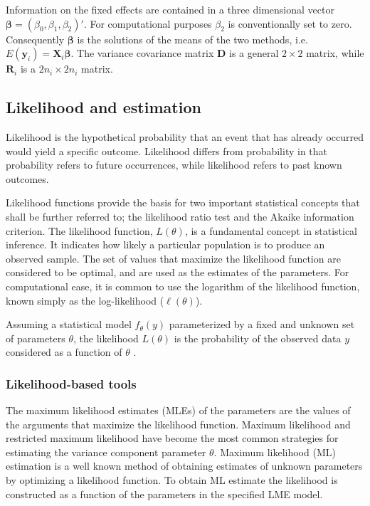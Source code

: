 \documentclass[12pt, a4paper]{report}
\theoremstyle{plain}
\theoremstyle{definition}
\theoremstyle{remark}
\begin{document}
	Information on the fixed effects are contained in a three dimensional vector $\boldsymbol{\beta} = (\beta_{0},\beta_{1},\beta_{2})\prime$. For computational purposes $\beta_{2}$ is conventionally set to zero. Consequently $\boldsymbol{\beta}$ is the solutions of the means of the two methods, i.e. $E(\boldsymbol{y}_{i})  = \boldsymbol{X}_{i}\boldsymbol{\beta}$. The variance covariance matrix $\boldsymbol{D}$ is a general $2 \times 2$ matrix, while $\boldsymbol{R}_{i}$ is a $2n_{i} \times 2n_{i}$ matrix.
	
	
	
	
	
	
	
	\subsection{Likelihood and estimation}
	Likelihood is the hypothetical probability that an event that has
	already occurred would yield a specific outcome. Likelihood
	differs from probability in that probability refers to future
	occurrences, while likelihood refers to past known outcomes.
	
	
	Likelihood functions provide the basis for two important statistical concepts that shall be further referred to; the likelihood ratio test and the Akaike information criterion. The likelihood function, $L(\theta)$, is a fundamental concept in statistical
	inference. It indicates how likely a particular population is to produce an observed sample. The set of values that maximize the
	likelihood function are considered to be optimal, and are used as the estimates of the parameters. For computational ease, it is common to use the logarithm of the likelihood function, known simply as the log-likelihood ($\ell(\theta)$).
	
	Assuming a statistical model $f_{\theta}(y)$ parameterized by a fixed and unknown set of parameters $\theta$, the likelihood $L(\theta)$ is the probability of the observed data $y$ considered as a function of $\theta$ \citep{YLee}.
	
	\subsubsection{Likelihood-based tools}
	The maximum likelihood estimates (MLEs) of the parameters are the values of the arguments that maximize the likelihood function. Maximum likelihood and restricted maximum likelihood have become the most common strategies for estimating the variance component parameter $\theta.$ Maximum likelihood (ML) estimation is a well known method of
	obtaining estimates of unknown parameters by optimizing a likelihood function.  To obtain ML estimate the likelihood is constructed as a function of the parameters in the specified LME model. 
	
\end{document}
